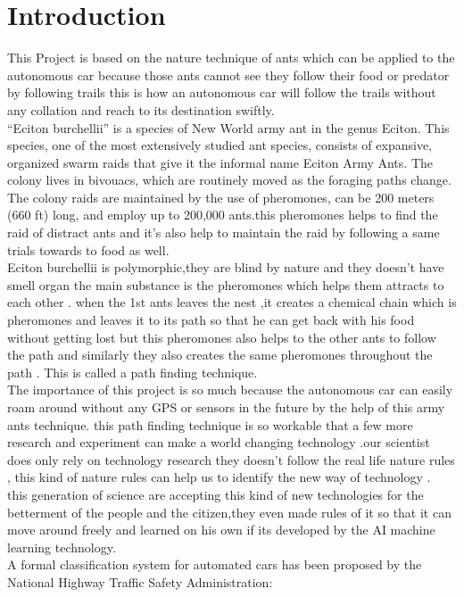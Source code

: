 \documentclass[conference]{IEEEtran}
\begin{document}
\section{Introduction}
This Project is based on the nature technique of ants which can be applied to the autonomous car because those ants cannot see they follow their food or predator by following trails this is how an autonomous car will follow the trails without any collation and reach to its destination swiftly.\\
“Eciton burchellii” is a species of New World army ant in the genus Eciton. This species, one of the most extensively studied ant species, consists of expansive, organized swarm raids that give it the informal name Eciton Army Ants. The colony lives in bivouacs, which are routinely moved as the foraging paths change. The colony raids are maintained by the use of pheromones, can be 200 meters (660 ft) long, and employ up to 200,000 ants.this pheromones helps to find the raid of distract ants and it's also help to maintain the raid by following a same trials towards to food as well.\\
 Eciton burchellii is polymorphic,they are blind by nature and they doesn't have smell organ the main substance is the pheromones which helps them attracts to each other . when the 1st ants leaves the nest ,it creates a chemical chain which is pheromones and leaves it to its path so that he can get back with his food without getting lost but this pheromones also helps to the other ants to follow the path and similarly they also creates the same pheromones throughout the path . This is called a path finding technique.\\
The importance of this project is so much because the autonomous car can easily roam around without any GPS or sensors in the future by the help of this army ants technique. this path finding technique is so workable that a few more research and experiment can make a world changing technology .our scientist does only rely on technology research they doesn't follow the real life nature rules , this kind of nature rules can help us to identify the new way of technology .\\
this generation of science are accepting this kind of new technologies for the betterment of the people and the citizen,they even made rules of it so that it can move around freely and learned on his own if its developed by the AI machine learning technology.\\
A formal classification system for automated cars has been proposed by the National Highway Traffic Safety Administration:\\
\end{document}
